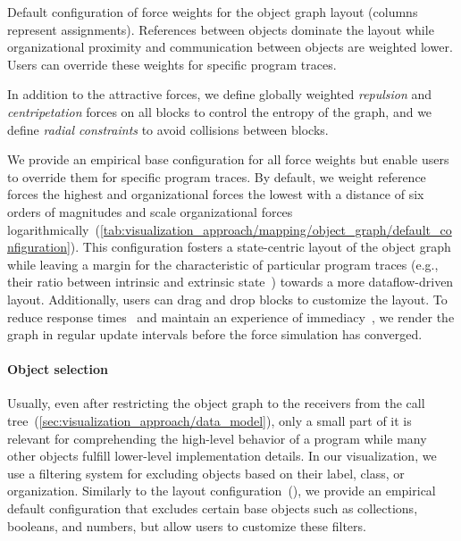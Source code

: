 \begin{table}
	\centering
	\caption{
		Default configuration of force weights for the object graph layout (columns represent assignments).
		References between objects dominate the layout while organizational proximity and communication between objects are weighted lower.
		Users can override these weights for specific program traces.
	}
	\label{tab:visualization_approach/mapping/object_graph/default_configuration}
	\begin{threeparttable}
		\centering
		{\footnotesize
		}
	\end{threeparttable}
\end{table}

In addition to the attractive forces, we define globally weighted \emph{repulsion} and \emph{centripetation} forces on all blocks to control the entropy of the graph, and we define \emph{radial constraints} to avoid collisions between blocks.

We provide an empirical base configuration for all force weights but enable users to override them for specific program traces.
By default, we weight reference forces the highest and organizational forces the lowest with a distance of six orders of magnitudes and scale organizational forces logarithmically~(\cref{tab:visualization_approach/mapping/object_graph/default_configuration}).
This configuration fosters a state-centric layout of the object graph while leaving a margin for the characteristic of particular program traces (e.g., their ratio between intrinsic and extrinsic state~\cite[p. 218ff]{gamma1994design}) towards a more dataflow-driven layout.
Additionally, users can drag and drop blocks to customize the layout.
To reduce response times~\cite[chap. 11]{shneiderman2005designing} and maintain an experience of immediacy~\cite{ungar1997debugging}, we render the graph in regular update intervals before the force simulation has converged.

\paragraph{Object selection}
\label{sec:visualization_approach/mapping/object_selection}

Usually, even after restricting the object graph to the receivers from the call tree~(\cref{sec:visualization_approach/data_model}), only a small part of it is relevant for comprehending the high-level behavior of a program while many other objects fulfill lower-level implementation details.
In our visualization, we use a filtering system for excluding objects based on their label, class, or organization.
Similarly to the layout configuration~(), we provide an empirical default configuration that excludes certain base objects such as collections, booleans, and numbers, but allow users to customize these filters.

